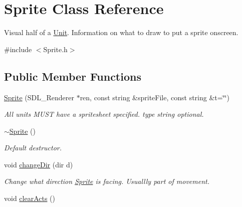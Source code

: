 \hypertarget{class_sprite}{}\section{Sprite Class Reference}
\label{class_sprite}


Visual half of a \hyperlink{class_unit}{Unit}. Information on what to draw to put a sprite onscreen.  




{\ttfamily \#include $<$Sprite.\+h$>$}

\subsection*{Public Member Functions}
\begin{DoxyCompactItemize}
\item 
\hyperlink{class_sprite_a874648e9628df9ca42f3672693adf3a3}{Sprite} (S\+D\+L\+\_\+\+Renderer $\ast$ren, const string \&sprite\+File, const string \&t=\char`\"{}\char`\"{})\hypertarget{class_sprite_a874648e9628df9ca42f3672693adf3a3}{}\label{class_sprite_a874648e9628df9ca42f3672693adf3a3}

\begin{DoxyCompactList}\small\item\em All units M\+U\+ST have a spritesheet specified. type string optional. \end{DoxyCompactList}\item 
\hyperlink{class_sprite_a8accab430f9d90ae5117b57d67e32b84}{$\sim$\+Sprite} ()\hypertarget{class_sprite_a8accab430f9d90ae5117b57d67e32b84}{}\label{class_sprite_a8accab430f9d90ae5117b57d67e32b84}

\begin{DoxyCompactList}\small\item\em Default destructor. \end{DoxyCompactList}\item 
void \hyperlink{class_sprite_a3eadf6ba2634a886862b6e2d9ca93b17}{change\+Dir} (dir d)\hypertarget{class_sprite_a3eadf6ba2634a886862b6e2d9ca93b17}{}\label{class_sprite_a3eadf6ba2634a886862b6e2d9ca93b17}

\begin{DoxyCompactList}\small\item\em Change what direction \hyperlink{class_sprite}{Sprite} is facing. Usuallly part of movement. \end{DoxyCompactList}\item 
void \hyperlink{class_sprite_ad22d9f033c1414853cc3063ceae24598}{clear\+Acts} ()\hypertarget{class_sprite_ad22d9f033c1414853cc3063ceae24598}{}\label{class_sprite_ad22d9f033c1414853cc3063ceae24598}


\end{DoxyCompactItemize}
